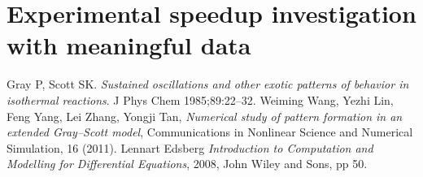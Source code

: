 \documentclass[a4paper,11pt]{article}
\begin{document}
\section*{Experimental speedup investigation with meaningful data}

\begin{thebibliography}{}
 Gray P, Scott SK. {\it Sustained oscillations and other exotic patterns of behavior in isothermal reactions}. J Phys Chem 1985;89:22–32.
 Weiming Wang, Yezhi Lin, Feng Yang, Lei Zhang, Yongji Tan, {\it Numerical study of pattern formation in an extended Gray–Scott model}, Communications in Nonlinear Science and Numerical Simulation, 16 (2011).
 Lennart Edsberg {\it Introduction to Computation and Modelling for Differential Equations}, 2008, John Wiley and Sons, pp 50.
\end{thebibliography}
\end{document}
